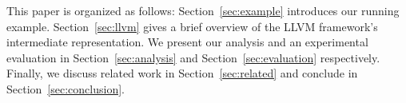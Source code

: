 This paper is organized as follows: Section~\ref{sec:example}
introduces our running example. Section~\ref{sec:llvm} gives
a brief overview of the LLVM framework's intermediate
representation. We present our analysis and an experimental
evaluation in Section~\ref{sec:analysis} and Section~\ref{sec:evaluation}
respectively. Finally, we discuss related work in Section~\ref{sec:related}
and conclude in Section~\ref{sec:conclusion}.